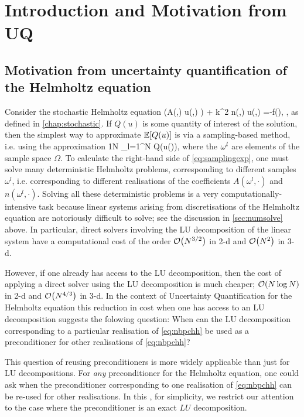 \section{Introduction and Motivation from UQ}\label{sec:intronbpc}

\subsection{Motivation from uncertainty quantification of the Helmholtz equation} 
Consider the stochastic Helmholtz equation 
\beq\label{eq:nbpchh}
\nabla\cdot\big(A(\omega,\bx) \nabla u(\omega,\bx) \big) + k^2 n(\omega,\bx) u(\omega,\bx) =-f(\bx), \quad \bx\in\Dp,
\eeq
as defined in \cref{chap:stochastic}. If $Q(u)$ is some quantity of interest of the solution, then the simplest way to approximate $\EXP{Q(u)}$ is via a sampling-based method, i.e. using the approximation
\beq\label{eq:samplingexp}
 \approx \frac1N \sum_{l=1}^N Q(u(\omegasl)),
\eeq
where the $\omega^{l}$ are elements of the sample space $\Omega.$ To calculate the right-hand side of \cref{eq:samplingexp},  one must solve many deterministic Helmholtz problems, corresponding to different samples $\omega^l$, i.e. corresponding to different realisations of the coefficients $A(\omega^l,\cdot)$ and $n(\omega^l,\cdot)$.
Solving all these deterministic problems is a very computationally-intensive task because linear systems arising from discretisations of the Helmholtz equation are notoriously difficult to solve; see the discussion in \cref{sec:numsolve} above. In particular, direct solvers involving the LU decomposition of the linear system have a computational cost of the order $\cO\mleft(N^{3/2}\mright)$ in 2-d and $\cO\mleft(N^2\mright)$ in 3-d.

However, if one already has access to the LU decomposition, then the cost of applying a direct solver using the LU decomposition is much cheaper; $\cO\mleft(N\log N\mright)$ in 2-d and $\cO\mleft(N^{4/3}\mright)$ in 3-d. In the context of Uncertainty Quantification for the Helmholtz equation this reduction in cost when one has access to an LU decomposition suggests the folowing question: When can the LU decomposition corresponding to a particular realisation of \cref{eq:nbpchh} be used as a preconditioner for other realisations of \cref{eq:nbpchh}?

This question of reusing preconditioners is more widely applicable than just for LU decompositions. For \emph{any} preconditioner for the Helmholtz equation, one could ask when the preconditioner corresponding to one realisation of \cref{eq:nbpchh} can be re-used for other realisations. In this , for simplicity, we restrict our attention to the case where the preconditioner is an exact $LU$ decomposition.

